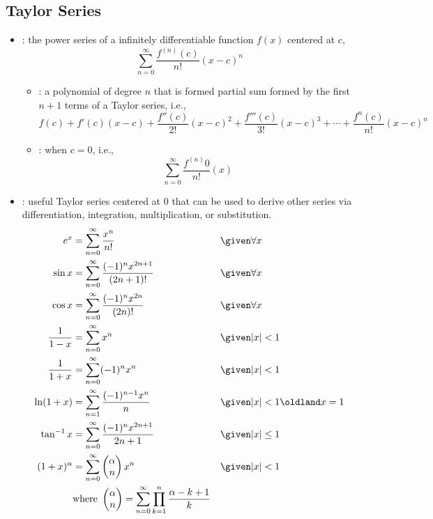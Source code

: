 \newpage %

\subsection{Taylor Series}
\begin{itemize}
  \item {}: the power series of a infinitely differentiable
    function \(f(x)\) centered at \(c\),
    \[%
      \sum_{n=0}^{\infty} \frac{f^{(n)}(c) }{n!} (x-c)^n
    \]%
  \begin{itemize}
    \item {}: a polynomial of degree \(n\)
      that is formed partial sum formed by the first \(n+1\) terms of a Taylor
      series, i.e.,
      \[%
      f(c) + f'(c)(x-c) + \frac{f''(c)}{2!}(x-c)^2 + \frac{f'''(c)}{3!}(x-c)^3
      + \cdots +  \frac{f^n (c)}{n!}(x-c)^n
      \]%
    \item {}: when \(c = 0\), i.e.,
      \[%
        \sum_{n=0}^{\infty} \frac{f^{(n)}0 }{n!} (x)
      \]%
  \end{itemize}

  \item {}: useful Taylor series centered at 0 that
    can be used to derive other series via differentiation, integration,
    multiplication, or substitution.
    \begin{align*}
      e^x &= \sum_{n=0}^{\infty} \frac{x^n}{n!} && \given \forall x\\
      \sin x &= \sum_{n=0}^{\infty} \frac{(-1)^n x^{2n+1} }{(2n+1)!}  && \given \forall x \\
      \cos x &= \sum_{n=0}^{\infty} \frac{(-1)^n x^{2n} }{(2n)!} && \given  \forall x\\
      \frac{1}{1-x} &= \sum_{n=0}^{\infty} x^n && \given |x| < 1 \\
      \frac{1}{1+x} &= \sum_{n=0}^{\infty} (-1)^n x^n && \given |x| < 1 \\
      \ln (1+x) &= \sum_{n=1}^{\infty}  \frac{(-1)^{n-1}x^n }{n} && \given  |x| < 1 \oldland x = 1\\
      \tan ^{-1} x &= \sum_{n=0}^{\infty}  \frac{(-1)^n x^{2n+1} }{2n+1} && \given |x| \leq 1 \\
      (1 + x)^\alpha  &= \sum_{n=0}^{\infty} \begin{pmatrix} \alpha \\ n
      \end{pmatrix} x^n  && \given |x| < 1 \\
                  &\text{where}~ \begin{pmatrix} \alpha \\ n \end{pmatrix} = \sum_{n=0}^{\infty} \prod_{k=1}^{n} \frac{\alpha - k + 1}{k}
      \end{align*}

\end{itemize}
